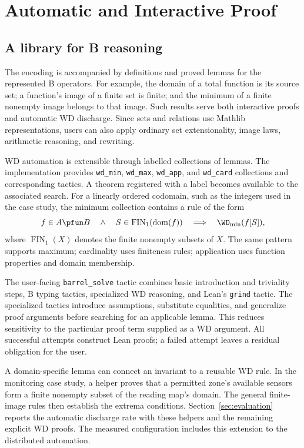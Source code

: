 \section{Automatic and Interactive Proof}
\label{sec:workflow}

\subsection{A library for B reasoning}

The encoding is accompanied by definitions and proved lemmas for the
represented B operators. For example, the domain of a total function is
its source set; a function's image of a finite set is finite; and the
minimum of a finite nonempty image belongs to that image. Such results
serve both interactive proofs and automatic WD discharge. Since sets
and relations use Mathlib representations, users can also apply ordinary
set extensionality, image laws, arithmetic reasoning, and rewriting.

WD automation is extensible through labelled collections of lemmas.
The implementation provides \texttt{wd\_min}, \texttt{wd\_max},
\texttt{wd\_app}, and \texttt{wd\_card} collections and corresponding
tactics. A theorem registered with a label becomes available to the
associated search. For a linearly ordered codomain, such as the integers
used in the case study, the minimum collection contains a rule of the form
\[
  f\in A\pfun B\quad\land\quad
  S\in\operatorname{FIN}_1(\operatorname{dom}(f))
  \quad\Longrightarrow\quad \WD_{\min}(f[S]),
\]
where $\operatorname{FIN}_1(X)$ denotes the finite nonempty subsets of $X$.
The same pattern supports maximum; cardinality uses finiteness rules;
application uses function properties and domain membership.

The user-facing \texttt{barrel\_solve} tactic combines basic introduction
and triviality steps, B typing tactics, specialized WD reasoning, and
Lean's \texttt{grind} tactic. The specialized tactics introduce assumptions,
substitute equalities, and generalize proof arguments before searching
for an applicable lemma. This reduces sensitivity to the particular
proof term supplied as a WD argument. All successful attempts construct
Lean proofs; a failed attempt leaves a residual obligation for the user.

A domain-specific lemma can connect an invariant to a reusable WD rule.
In the monitoring case study, a helper proves that a permitted zone's
available sensors form a finite nonempty subset of the reading map's domain.
The general finite-image rules then establish the extrema conditions.
Section~\ref{sec:evaluation} reports the automatic discharge rate with
these helpers and the remaining explicit WD proofs. The measured
configuration includes this extension to the distributed automation.

